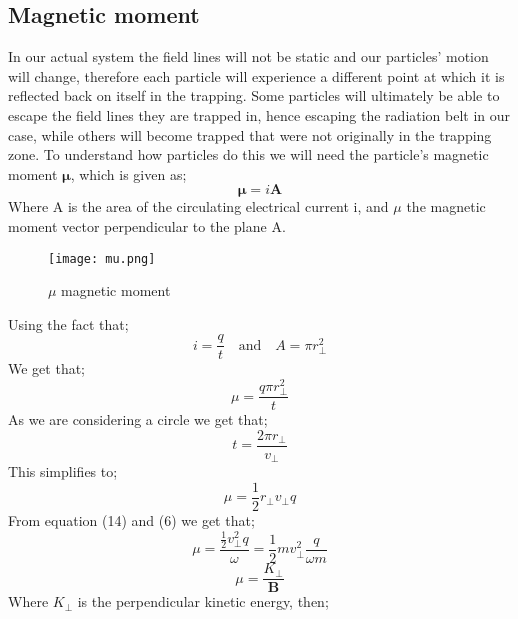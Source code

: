\documentclass[14paper,11pt,hidelinks]{article}
\begin{document}
\subsection{Magnetic moment}
In our actual system the field lines will not be static and our particles' motion will change, therefore each particle will experience a different point at which it is reflected back on itself in the trapping. Some particles will ultimately be able to escape the field lines they are trapped in, hence escaping the radiation belt in our case, while others will become trapped that were not originally in the trapping zone. To understand how particles do this we will need the particle's magnetic moment \begin{math} \mathbf{\mu} \end{math}, which is given as;
\begin{equation}
\mathbf{\mu}=i\mathbf{A}
\end{equation}
Where A is the area of the circulating electrical current i, and \begin{math} \mu \end{math} the magnetic moment vector perpendicular to the plane A. 
\newline
\begin{figure}[!ht]
\centering
\texttt{[image: mu.png]} 
\caption{$\mu$ magnetic moment}
\end{figure}
\newline
Using the fact that;
\begin{equation}
i=\frac{q}{t} \quad \mbox{and}  \quad A=\pi r_\bot^2 
\end{equation}
We get that;
\begin{equation}
\mu=\frac{q\pi r_{\bot}^2}{t}
\end{equation}
As we are considering a circle we get that;
\begin{equation}
t=\frac{2\pi r_\bot}{v_\bot}
\end{equation}
This simplifies to;
\begin{equation}
\mu=\frac{1}{2}r_\bot v_\bot q
\end{equation}
From equation (14) and (6) we get that;
\begin{equation}
\mu=\frac{\frac{1}{2}v_\bot^2 q}{\omega}=\frac{1}{2}m v_\bot^2\frac{q}{\omega m}
\end{equation}
\begin{equation}
\mu=\frac{K_\bot}{\mathbf{B}}
\end{equation}
Where \begin{math} K_\bot \end{math} is the perpendicular kinetic energy, then;
\end{document}

